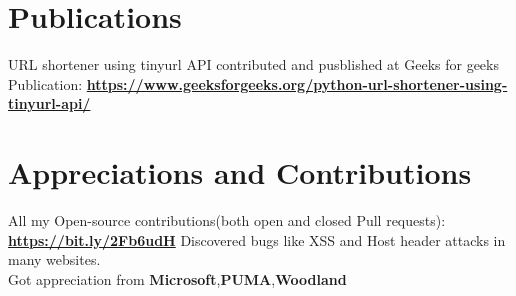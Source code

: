 \documentclass[]{deedy-resume-openfont}
\begin{document}
\begin{minipage}[t]{0.66\textwidth}

\section{Publications} 
URL shortener using tinyurl API contributed and pusblished at Geeks for geeks\\
Publication: \textbf{\href{https://www.geeksforgeeks.org/python-url-shortener-using-tinyurl-api/}{https://www.geeksforgeeks.org/python-url-shortener-using-tinyurl-api/}}
\sectionsep


\section{Appreciations and Contributions}
All my Open-source contributions(both open and closed Pull requests): \textbf{\href{https://bit.ly/2Fb6udH}{https://bit.ly/2Fb6udH}}
\newline \newline
Discovered bugs like XSS and Host header attacks in many websites.\\
Got appreciation from \textbf{Microsoft},\textbf{PUMA},\textbf{Woodland}

\end{minipage}
\newpage
\hfill
\end{document}

